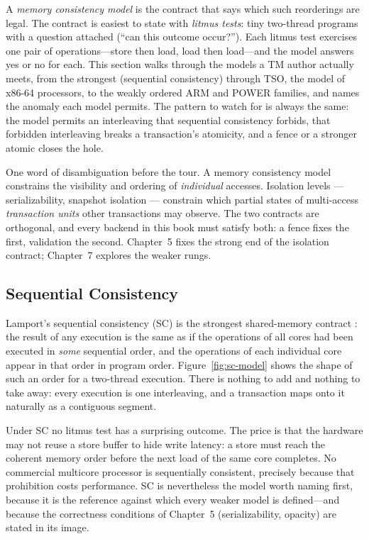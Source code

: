 A \emph{memory consistency model} is the contract that says which such
reorderings are legal. The contract is easiest to state with \emph{litmus
tests}: tiny two-thread programs with a question attached (``can this
outcome occur?''). Each litmus test exercises one pair of operations---store
then load, load then load---and the model answers yes or no for each. This
section walks through the models a TM author actually meets, from the
strongest (sequential consistency) through TSO, the model of x86-64
processors, to the weakly ordered ARM and POWER families, and names the
anomaly each model permits. The pattern to watch for is always the same: the
model permits an interleaving that sequential consistency forbids, that
forbidden interleaving breaks a transaction's atomicity, and a fence or a
stronger atomic closes the hole.

One word of disambiguation before the tour. A memory consistency model
constrains the visibility and ordering of \emph{individual} accesses.
Isolation levels --- serializability, snapshot isolation --- constrain which
partial states of multi-access \emph{transaction units} other transactions may
observe. The two contracts are orthogonal, and every backend in this book must
satisfy both: a fence fixes the first, validation the second. Chapter~5 fixes
the strong end of the isolation contract; Chapter~7 explores the weaker rungs.

\subsection{Sequential Consistency}

Lamport's sequential consistency (SC) is the strongest shared-memory
contract \cite{lamport79sc}: the result of any execution is the same as if
the operations of all cores had been executed in \emph{some} sequential
order, and the operations of each individual core appear in that order in
program order. Figure~\ref{fig:sc-model} shows the shape of such an order
for a two-thread execution. There is nothing to add and nothing to take
away: every execution is one interleaving, and a transaction maps onto it
naturally as a contiguous segment.

Under SC no litmus test has a surprising outcome. The price is that the
hardware may not reuse a store buffer to hide write latency: a store must
reach the coherent memory order before the next load of the same core
completes. No commercial multicore processor is sequentially consistent,
precisely because that prohibition costs performance. SC is nevertheless
the model worth naming first, because it is the reference against which
every weaker model is defined---and because the correctness conditions of
Chapter~5 (serializability, opacity) are stated in its image.


